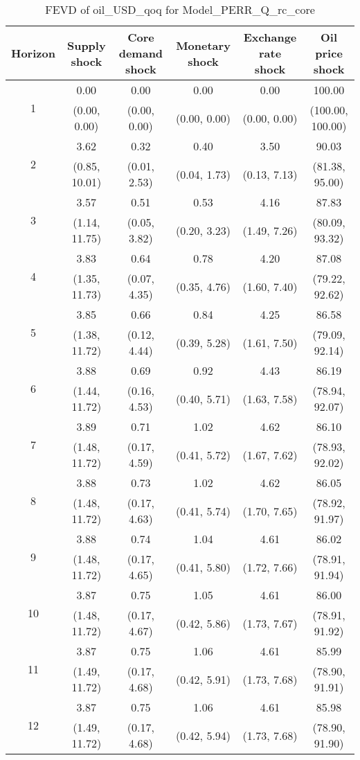 \documentclass{article}
\begin{document}
\begin{table}
	\footnotesize
	\caption{FEVD of oil_USD_qoq for Model_PERR_Q_rc_core}
	\begin{tabular}{cccccc}
		Horizon & Supply shock & Core demand shock & Monetary shock & Exchange rate shock & Oil price shock\\ \hline
		\multirow{2}{*}{1} & 0.00 & 0.00 & 0.00 & 0.00 & 100.00\\
		 & (0.00, 0.00) & (0.00, 0.00) & (0.00, 0.00) & (0.00, 0.00) & (100.00, 100.00)\\
		\multirow{2}{*}{2} & 3.62 & 0.32 & 0.40 & 3.50 & 90.03\\
		 & (0.85, 10.01) & (0.01, 2.53) & (0.04, 1.73) & (0.13, 7.13) & (81.38, 95.00)\\
		\multirow{2}{*}{3} & 3.57 & 0.51 & 0.53 & 4.16 & 87.83\\
		 & (1.14, 11.75) & (0.05, 3.82) & (0.20, 3.23) & (1.49, 7.26) & (80.09, 93.32)\\
		\multirow{2}{*}{4} & 3.83 & 0.64 & 0.78 & 4.20 & 87.08\\
		 & (1.35, 11.73) & (0.07, 4.35) & (0.35, 4.76) & (1.60, 7.40) & (79.22, 92.62)\\
		\multirow{2}{*}{5} & 3.85 & 0.66 & 0.84 & 4.25 & 86.58\\
		 & (1.38, 11.72) & (0.12, 4.44) & (0.39, 5.28) & (1.61, 7.50) & (79.09, 92.14)\\
		\multirow{2}{*}{6} & 3.88 & 0.69 & 0.92 & 4.43 & 86.19\\
		 & (1.44, 11.72) & (0.16, 4.53) & (0.40, 5.71) & (1.63, 7.58) & (78.94, 92.07)\\
		\multirow{2}{*}{7} & 3.89 & 0.71 & 1.02 & 4.62 & 86.10\\
		 & (1.48, 11.72) & (0.17, 4.59) & (0.41, 5.72) & (1.67, 7.62) & (78.93, 92.02)\\
		\multirow{2}{*}{8} & 3.88 & 0.73 & 1.02 & 4.62 & 86.05\\
		 & (1.48, 11.72) & (0.17, 4.63) & (0.41, 5.74) & (1.70, 7.65) & (78.92, 91.97)\\
		\multirow{2}{*}{9} & 3.88 & 0.74 & 1.04 & 4.61 & 86.02\\
		 & (1.48, 11.72) & (0.17, 4.65) & (0.41, 5.80) & (1.72, 7.66) & (78.91, 91.94)\\
		\multirow{2}{*}{10} & 3.87 & 0.75 & 1.05 & 4.61 & 86.00\\
		 & (1.48, 11.72) & (0.17, 4.67) & (0.42, 5.86) & (1.73, 7.67) & (78.91, 91.92)\\
		\multirow{2}{*}{11} & 3.87 & 0.75 & 1.06 & 4.61 & 85.99\\
		 & (1.49, 11.72) & (0.17, 4.68) & (0.42, 5.91) & (1.73, 7.68) & (78.90, 91.91)\\
		\multirow{2}{*}{12} & 3.87 & 0.75 & 1.06 & 4.61 & 85.98\\
		 & (1.49, 11.72) & (0.17, 4.68) & (0.42, 5.94) & (1.73, 7.68) & (78.90, 91.90)\\
	\end{tabular}
\label{tab:fevd-Model_PERR_Q_rc_core-oil_USD_qoq}
\end{table}
\end{document}
